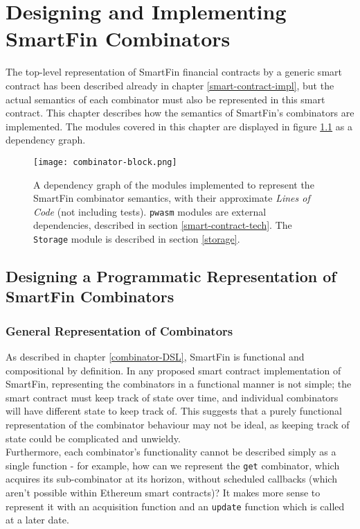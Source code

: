 \chapter{Designing and Implementing SmartFin Combinators} \label{combinators-main}

The top-level representation of SmartFin financial contracts by a generic smart contract has been described already in chapter \ref{smart-contract-impl}, but the actual semantics of each combinator must also be represented in this smart contract. This chapter describes how the semantics of SmartFin's combinators are implemented. The modules covered in this chapter are displayed in figure \ref{fig:combinator-block} as a dependency graph. \\

\begin{figure}[h]
    \centering
    \texttt{[image: combinator-block.png]}
    \caption{A dependency graph of the modules implemented to represent the SmartFin combinator semantics, with their approximate \textit{Lines of Code} (not including tests). \texttt{pwasm} modules are external dependencies, described in section \ref{smart-contract-tech}. The \texttt{Storage} module is described in section \ref{storage}.}
    \label{fig:combinator-block}
\end{figure}


\section{Designing a Programmatic Representation of SmartFin Combinators} \label{combinators-design}

\subsection{General Representation of Combinators}

As described in chapter \ref{combinator-DSL}, SmartFin is functional and compositional by definition. In any proposed smart contract implementation of SmartFin, representing the combinators in a functional manner is not simple; the smart contract must keep track of state over time, and individual combinators will have different state to keep track of. This suggests that a purely functional representation of the combinator behaviour may not be ideal, as keeping track of state could be complicated and unwieldy. \\

Furthermore, each combinator's functionality cannot be described simply as a single function - for example, how can we represent the \texttt{get} combinator, which acquires its sub-combinator at its horizon, without scheduled callbacks (which aren't possible within Ethereum smart contracts)? It makes more sense to represent it with an acquisition function and an \texttt{update} function which is called at a later date. \\

